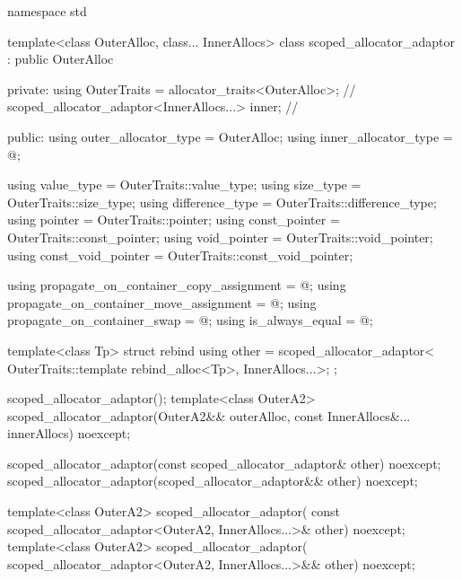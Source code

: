 %
%
%
%
%
%
%
%
%
\begin{codeblock}
namespace std {
  template<class OuterAlloc, class... InnerAllocs>
  class scoped_allocator_adaptor : public OuterAlloc {
  private:
    using OuterTraits = allocator_traits<OuterAlloc>;   // \expos
    scoped_allocator_adaptor<InnerAllocs...> inner;     // \expos

  public:
    using outer_allocator_type = OuterAlloc;
    using inner_allocator_type = @\seebelow@;

    using value_type           = OuterTraits::value_type;
    using size_type            = OuterTraits::size_type;
    using difference_type      = OuterTraits::difference_type;
    using pointer              = OuterTraits::pointer;
    using const_pointer        = OuterTraits::const_pointer;
    using void_pointer         = OuterTraits::void_pointer;
    using const_void_pointer   = OuterTraits::const_void_pointer;

    using propagate_on_container_copy_assignment = @\seebelow@;
    using propagate_on_container_move_assignment = @\seebelow@;
    using propagate_on_container_swap            = @\seebelow@;
    using is_always_equal                        = @\seebelow@;

    template<class Tp> struct rebind {
      using other = scoped_allocator_adaptor<
        OuterTraits::template rebind_alloc<Tp>, InnerAllocs...>;
    };

    scoped_allocator_adaptor();
    template<class OuterA2>
      scoped_allocator_adaptor(OuterA2&& outerAlloc,
                               const InnerAllocs&... innerAllocs) noexcept;

    scoped_allocator_adaptor(const scoped_allocator_adaptor& other) noexcept;
    scoped_allocator_adaptor(scoped_allocator_adaptor&& other) noexcept;

    template<class OuterA2>
      scoped_allocator_adaptor(
        const scoped_allocator_adaptor<OuterA2, InnerAllocs...>& other) noexcept;
    template<class OuterA2>
      scoped_allocator_adaptor(
        scoped_allocator_adaptor<OuterA2, InnerAllocs...>&& other) noexcept;

}}
\end{codeblock}
